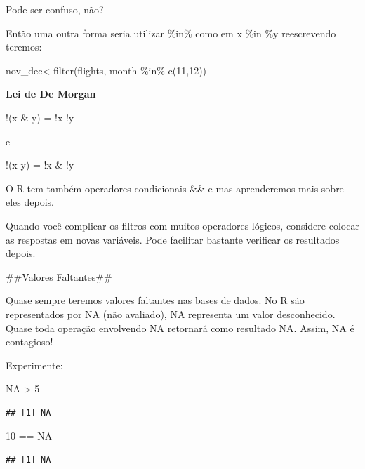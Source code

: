 \documentclass[
]{article}
\newenvironment{Shaded}{\begin{snugshade}}{\end{snugshade}}
\newcommand{\ConstantTok}[1]{\textcolor[rgb]{0.00,0.00,0.00}{#1}}
\newcommand{\DecValTok}[1]{\textcolor[rgb]{0.00,0.00,0.81}{#1}}
\newcommand{\FunctionTok}[1]{\textcolor[rgb]{0.00,0.00,0.00}{#1}}
\newcommand{\NormalTok}[1]{#1}
\newcommand{\OtherTok}[1]{\textcolor[rgb]{0.56,0.35,0.01}{#1}}
\newcommand{\SpecialCharTok}[1]{\textcolor[rgb]{0.00,0.00,0.00}{#1}}
\begin{document}
Pode ser confuso, não?

Então uma outra forma seria utilizar \%in\% como em x \%in \%y
reescrevendo teremos:

\begin{Shaded}
\begin{Highlighting}[]
\NormalTok{nov\_dec}\OtherTok{\textless{}{-}}\FunctionTok{filter}\NormalTok{(flights, month }\SpecialCharTok{\%in\%} \FunctionTok{c}\NormalTok{(}\DecValTok{11}\NormalTok{,}\DecValTok{12}\NormalTok{))}
\end{Highlighting}
\end{Shaded}

\textbf{Lei de De Morgan }

!(x \& y) = !x \textbar{} !y

e

!(x \textbar{} y) = !x \& !y

O R tem também operadores condicionais \&\& e \textbar\textbar{} mas
aprenderemos mais sobre eles depois.

Quando você complicar os filtros com muitos operadores lógicos,
considere colocar as respostas em novas variáveis. Pode facilitar
bastante verificar os resultados depois.

\#\#Valores Faltantes\#\#

Quase sempre teremos valores faltantes nas bases de dados. No R são
representados por NA (não avaliado), NA representa um valor
desconhecido. Quase toda operação envolvendo NA retornará como resultado
NA. Assim, NA é contagioso!

Experimente:

\begin{Shaded}
\begin{Highlighting}[]
\ConstantTok{NA} \SpecialCharTok{\textgreater{}} \DecValTok{5}
\end{Highlighting}
\end{Shaded}

\begin{verbatim}
## [1] NA
\end{verbatim}

\begin{Shaded}
\begin{Highlighting}[]
\DecValTok{10} \SpecialCharTok{==} \ConstantTok{NA}
\end{Highlighting}
\end{Shaded}

\begin{verbatim}
## [1] NA
\end{verbatim}
\end{document}
